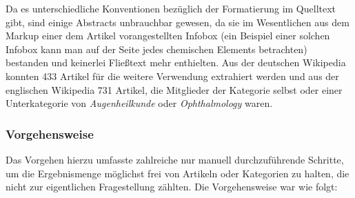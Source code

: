 \documentclass[pagesize,DIV=calc,12pt,draft]{scrreprt}
\begin{document}
Da es unterschiedliche Konventionen bezüglich der Formatierung im Quelltext gibt, sind einige Abstracts unbrauchbar gewesen, da sie im Wesentlichen aus dem Markup einer dem Artikel vorangestellten Infobox (ein Beispiel einer solchen Infobox kann man auf der Seite jedes chemischen Elements betrachten) bestanden und keinerlei Fließtext mehr enthielten. 
Aus der deutschen Wikipedia konnten 433 Artikel für die weitere Verwendung extrahiert werden und aus der englischen Wikipedia 731 Artikel, die Mitglieder der Kategorie selbst oder einer Unterkategorie von \emph{Augenheilkunde} oder \emph{Ophthalmology} waren. 

\subsubsection{Vorgehensweise}

Das Vorgehen hierzu umfasste zahlreiche nur manuell durchzuführende Schritte, um die Ergebnismenge möglichst frei von Artikeln oder Kategorien zu halten, die nicht zur eigentlichen Fragestellung zählten. 
Die Vorgehensweise war wie folgt: 
\end{document}
